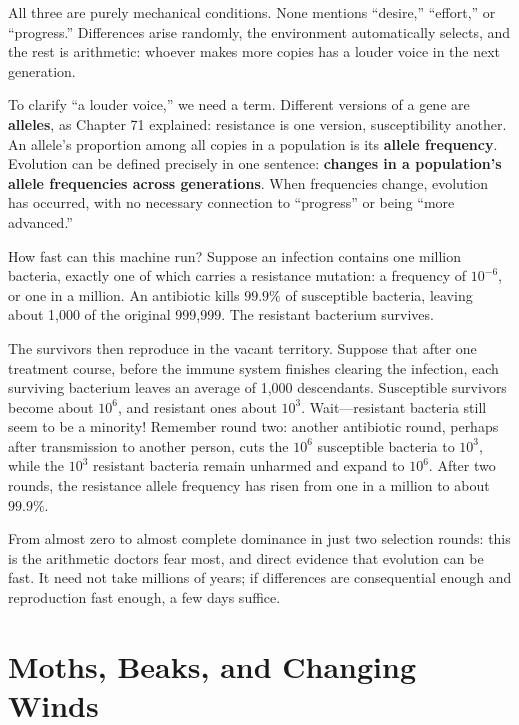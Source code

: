 All three are purely mechanical conditions. None mentions ``desire,'' ``effort,'' or ``progress.'' Differences arise randomly, the environment automatically selects, and the rest is arithmetic: whoever makes more copies has a louder voice in the next generation.

To clarify ``a louder voice,'' we need a term. Different versions of a gene are \textbf{alleles}, as Chapter 71 explained: resistance is one version, susceptibility another. An allele's proportion among all copies in a population is its \textbf{allele frequency}. Evolution can be defined precisely in one sentence: \textbf{changes in a population's allele frequencies across generations}. When frequencies change, evolution has occurred, with no necessary connection to ``progress'' or being ``more advanced.''

\begin{qiaoliang}
How fast can this machine run? Suppose an infection contains one million bacteria, exactly one of which carries a resistance mutation: a frequency of $10^{-6}$, or one in a million. An antibiotic kills $99.9\%$ of susceptible bacteria, leaving about 1,000 of the original 999,999. The resistant bacterium survives.

The survivors then reproduce in the vacant territory. Suppose that after one treatment course, before the immune system finishes clearing the infection, each surviving bacterium leaves an average of 1,000 descendants. Susceptible survivors become about $10^6$, and resistant ones about $10^3$. Wait---resistant bacteria still seem to be a minority! Remember round two: another antibiotic round, perhaps after transmission to another person, cuts the $10^6$ susceptible bacteria to $10^3$, while the $10^3$ resistant bacteria remain unharmed and expand to $10^6$. After two rounds, the resistance allele frequency has risen from one in a million to about $99.9\%$.

From almost zero to almost complete dominance in just two selection rounds: this is the arithmetic doctors fear most, and direct evidence that evolution can be fast. It need not take millions of years; if differences are consequential enough and reproduction fast enough, a few days suffice.
\end{qiaoliang}

\section{Moths, Beaks, and Changing Winds}


